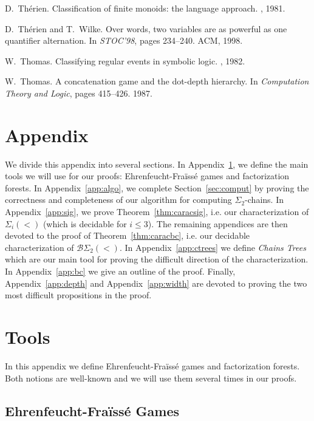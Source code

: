 \documentclass[envcountsame]{llncs}
\newcommand{\efgame}{Ehrenfeucht-Fra\"iss\'e\xspace}
\newcommand{\sic}[1]{\ensuremath{\Sigma_{#1}}\xspace}
\newcommand{\siw}[1]{\ensuremath{\Sigma_{#1}(<)}\xspace}
\newcommand{\bswd}{\ensuremath{\mathcal{B}\Sigma_{2}(<)}\xspace}
\newcommand\lmo{\ensuremath{\leqslant}\xspace}
\newcommand\qchains[1]{\ensuremath{\sic{#1}}-chains\xspace}
\newcommand\Chains{Chains\xspace}
\newcommand\dchains{\qchains{2}}
\begin{document}
\begin{thebibliography}{10}
D.~Th{\'e}rien.
\newblock Classification of finite monoids: the language approach.
, 1981.

D.~Th\'{e}rien and T.~Wilke.
\newblock Over words, two variables are as powerful as one quantifier
  alternation.
\newblock In {\em STOC'98}, pages 234--240. ACM, 1998.

W.~Thomas.
\newblock Classifying regular events in symbolic logic.
, 1982.

W.~Thomas.
\newblock A concatenation game and the dot-depth hierarchy.
\newblock In {\em Computation Theory and Logic}, pages 415--426. 1987.

\end{thebibliography}

\appendix
\newpage

\section*{Appendix}
We divide this appendix into several sections. In Appendix~\ref{app:facto}, we
define the main tools we will use for our proofs: \efgame games and
factorization forests.  In Appendix~\ref{app:algo}, we complete
Section~\ref{sec:comput} by proving the correctness and completeness of our
algorithm for computing \dchains. In Appendix~\ref{app:sig}, we prove
Theorem~\ref{thm:caracsig}, i.e. our characterization of \siw{i} (which is
decidable for $i \lmo 3$). The remaining appendices are then devoted to the
proof of Theorem~\ref{thm:caracbc}, i.e. our decidable characterization of
\bswd. In Appendix~\ref{app:ctrees} we define \emph{\Chains Trees} which are
our main tool for proving the difficult direction of the characterization. In
Appendix~\ref{app:bc} we give an outline of the proof. Finally,
Appendix~\ref{app:depth} and Appendix~\ref{app:width} are devoted to proving
the two most difficult propositions in the proof.

\section{Tools}
\label{app:facto}
In this appendix we define \efgame games and factorization
forests. Both notions are well-known and we will use them
several times in our proofs.

\subsection{\efgame Games}
\end{document}

